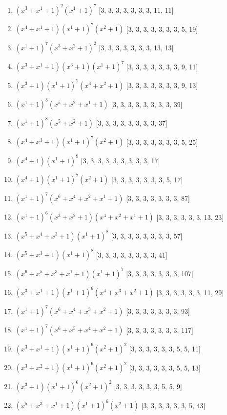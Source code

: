 \documentclass[10pt,twocolumn]{article}
\begin{document}
\begin{enumerate}
\item $(x^{3} + x^{1} + 1)^{2}(x^{1} + 1)^{7}$  [3, 3, 3, 3, 3, 3, 3, 11, 11]
\item $(x^{4} + x^{1} + 1)(x^{1} + 1)^{7}(x^{2} + 1)$  [3, 3, 3, 3, 3, 3, 3, 5, 19]
\item $(x^{1} + 1)^{7}(x^{3} + x^{2} + 1)^{2}$  [3, 3, 3, 3, 3, 3, 3, 13, 13]
\item $(x^{3} + x^{1} + 1)(x^{3} + 1)(x^{1} + 1)^{7}$  [3, 3, 3, 3, 3, 3, 3, 9, 11]
\item $(x^{3} + 1)(x^{1} + 1)^{7}(x^{3} + x^{2} + 1)$  [3, 3, 3, 3, 3, 3, 3, 9, 13]
\item $(x^{1} + 1)^{8}(x^{5} + x^{2} + x^{1} + 1)$  [3, 3, 3, 3, 3, 3, 3, 3, 39]
\item $(x^{1} + 1)^{8}(x^{5} + x^{2} + 1)$  [3, 3, 3, 3, 3, 3, 3, 3, 37]
\item $(x^{4} + x^{3} + 1)(x^{1} + 1)^{7}(x^{2} + 1)$  [3, 3, 3, 3, 3, 3, 3, 5, 25]
\item $(x^{4} + 1)(x^{1} + 1)^{9}$  [3, 3, 3, 3, 3, 3, 3, 3, 3, 17]
\item $(x^{4} + 1)(x^{1} + 1)^{7}(x^{2} + 1)$  [3, 3, 3, 3, 3, 3, 3, 5, 17]
\item $(x^{1} + 1)^{7}(x^{6} + x^{4} + x^{2} + x^{1} + 1)$  [3, 3, 3, 3, 3, 3, 3, 87]
\item $(x^{1} + 1)^{6}(x^{3} + x^{2} + 1)(x^{4} + x^{2} + x^{1} + 1)$  [3, 3, 3, 3, 3, 3, 13, 23]
\item $(x^{5} + x^{4} + x^{3} + 1)(x^{1} + 1)^{8}$  [3, 3, 3, 3, 3, 3, 3, 3, 57]
\item $(x^{5} + x^{3} + 1)(x^{1} + 1)^{8}$  [3, 3, 3, 3, 3, 3, 3, 3, 41]
\item $(x^{6} + x^{5} + x^{3} + x^{1} + 1)(x^{1} + 1)^{7}$  [3, 3, 3, 3, 3, 3, 3, 107]
\item $(x^{3} + x^{1} + 1)(x^{1} + 1)^{6}(x^{4} + x^{3} + x^{2} + 1)$  [3, 3, 3, 3, 3, 3, 11, 29]
\item $(x^{1} + 1)^{7}(x^{6} + x^{4} + x^{3} + x^{2} + 1)$  [3, 3, 3, 3, 3, 3, 3, 93]
\item $(x^{1} + 1)^{7}(x^{6} + x^{5} + x^{4} + x^{2} + 1)$  [3, 3, 3, 3, 3, 3, 3, 117]
\item $(x^{3} + x^{1} + 1)(x^{1} + 1)^{6}(x^{2} + 1)^{2}$  [3, 3, 3, 3, 3, 3, 5, 5, 11]
\item $(x^{3} + x^{2} + 1)(x^{1} + 1)^{6}(x^{2} + 1)^{2}$  [3, 3, 3, 3, 3, 3, 5, 5, 13]
\item $(x^{3} + 1)(x^{1} + 1)^{6}(x^{2} + 1)^{2}$  [3, 3, 3, 3, 3, 3, 5, 5, 9]
\item $(x^{5} + x^{3} + x^{1} + 1)(x^{1} + 1)^{6}(x^{2} + 1)$  [3, 3, 3, 3, 3, 3, 5, 43]

\end{enumerate}
\end{document}
